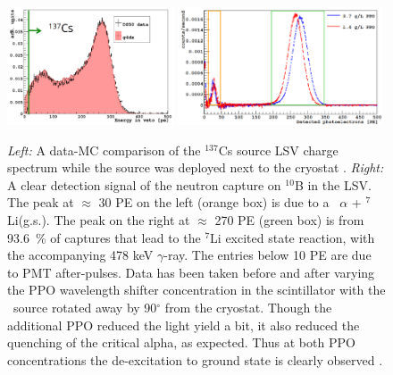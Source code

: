 \begin{figure}[htbp]
\centering
\includegraphics[width=0.44\textwidth]{./Figures/137Cs_Veto_Paolo_G4DS_UCLA}
\includegraphics[width=0.54\textwidth]{./Figures/AmBe_LSV_VetoPaper}
\caption{\textit{Left:} A data-MC comparison of the $^{137}$Cs source LSV charge spectrum while the source was deployed next to the cryostat \cite{DS50:G4DS:paper}.
\textit{Right:} A clear detection signal of the neutron capture on $^{10}$B in the LSV. The peak at $\approx$ 30 PE on the left (orange box) is due to a \enbortengroundalpha\ $\alpha$ + $^7$Li(g.s.). The peak on the right at $\approx$ 270 PE (green box) is from 93.6~\% of captures that lead to the $^7$Li excited state reaction, with the accompanying 478 keV $\gamma$-ray. The entries below 10 PE are due to PMT after-pulses. Data has been taken before and after varying the PPO wavelength shifter concentration in the scintillator with the \AmBe\ source rotated away by 90$^{\circ}$ from the cryostat. Though the additional PPO reduced the light yield a bit, it also reduced the quenching of the critical alpha, as expected. Thus at both PPO concentrations the de-excitation to ground state is clearly observed \cite{Agnes:2015qyz}.
\label{fig:LSV:Calib}} 
\end{figure}